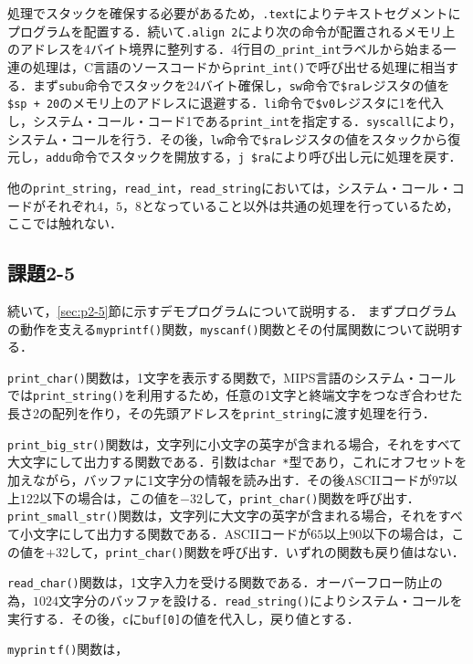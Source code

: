 処理でスタックを確保する必要があるため，\verb|.text|によりテキストセグメントにプログラムを配置する．続いて\verb|.align 2|により次の命令が配置されるメモリ上のアドレスを4バイト境界に整列する．4行目の\verb|_print_int|ラベルから始まる一連の処理は，C言語のソースコードから\verb|print_int()|で呼び出せる処理に相当する．まず\verb|subu|命令でスタックを24バイト確保し，\verb|sw|命令で\verb|$ra|レジスタの値を\verb|$sp + 20|のメモリ上のアドレスに退避する．\verb|li|命令で\verb|$v0|レジスタに1を代入し，システム・コール・コード1である\verb|print_int|を指定する．\verb|syscall|により，システム・コールを行う．その後，\verb|lw|命令で\verb|$ra|レジスタの値をスタックから復元し，\verb|addu|命令でスタックを開放する，\verb|j $ra|により呼び出し元に処理を戻す．

他の\verb|print_string|，\verb|read_int|，\verb|read_string|においては，システム・コール・コードがそれぞれ$4$，$5$，$8$となっていること以外は共通の処理を行っているため，ここでは触れない．



\subsection{課題2-5}
続いて，\ref{sec:p2-5}節に示すデモプログラムについて説明する．
まずプログラムの動作を支える\verb|myprintf()|関数，\verb|myscanf()|関数とその付属関数について説明する．

\verb|print_char()|関数は，1文字を表示する関数で，MIPS言語のシステム・コールでは\verb|print_string()|を利用するため，任意の1文字と終端文字をつなぎ合わせた長さ2の配列を作り，その先頭アドレスを\verb|print_string|に渡す処理を行う．

\verb|print_big_str()|関数は，文字列に小文字の英字が含まれる場合，それをすべて大文字にして出力する関数である．引数は\verb|char *|型であり，これにオフセットを加えながら，バッファに1文字分の情報を読み出す．その後ASCIIコードが$97$以上$122$以下の場合は，この値を$-32$して，\verb|print_char()|関数を呼び出す．\verb|print_small_str()|関数は，文字列に大文字の英字が含まれる場合，それをすべて小文字にして出力する関数である．ASCIIコードが$65$以上$90$以下の場合は，この値を$+32$して，\verb|print_char()|関数を呼び出す．いずれの関数も戻り値はない．

\verb|read_char()|関数は，1文字入力を受ける関数である．オーバーフロー防止の為，$1024$文字分のバッファを設ける．\verb|read_string()|によりシステム・コールを実行する．その後，\verb|c|に\verb|buf[0]|の値を代入し，戻り値とする．

\verb|myprinｔf()|関数は，

